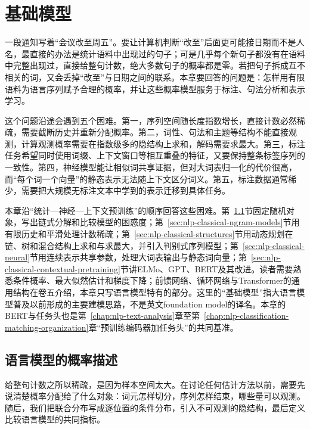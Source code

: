 \chapter{基础模型}
\label{chap:nlp-classical-models}

一段通知写着“会议改至周五”。要让计算机判断“改至”后面更可能接日期而不是人名，最直接的办法是统计语料中出现过的句子；可是几乎每个新句子都没有在语料中完整出现过，直接给整句计数，绝大多数句子的概率都是零。若把句子拆成互不相关的词，又会丢掉“改至”与日期之间的联系。本章要回答的问题是：怎样用有限语料为语言序列赋予合理的概率，并让这些概率模型服务于标注、句法分析和表示学习。

这个问题沿途会遇到五个困难。第一，序列空间随长度指数增长，直接计数必然稀疏，需要截断历史并重新分配概率。第二，词性、句法和主题等结构不能直接观测，计算观测概率需要在指数级多的隐结构上求和，解码需要求最大。第三，标注任务希望同时使用词缀、上下文窗口等相互重叠的特征，又要保持整条标签序列的一致性。第四，神经模型能让相似词共享证据，但对大词表归一化的代价很高，而“每个词一个向量”的静态表示无法随上下文区分词义。第五，标注数据通常稀少，需要把大规模无标注文本中学到的表示迁移到具体任务。

本章沿“统计—神经—上下文预训练”的顺序回答这些困难。第~\ref{sec:nlp-classical-probability}节固定随机对象，写出链式分解和比较模型的困惑度；第~\ref{sec:nlp-classical-ngram-models}节用有限历史和平滑处理计数稀疏；第~\ref{sec:nlp-classical-structures}节用动态规划在链、树和混合结构上求和与求最大，并引入判别式序列模型；第~\ref{sec:nlp-classical-neural}节用连续表示共享参数，处理大词表输出与静态词向量；第~\ref{sec:nlp-classical-contextual-pretraining}节讲ELMo、GPT、BERT及其改进。读者需要熟悉条件概率、最大似然估计和梯度下降；前馈网络、循环网络与Transformer的通用结构在卷五介绍，本章只写语言模型特有的部分。这里的“基础模型”指大语言模型普及以前形成的主要建模思路，不是英文foundation model的译名。本章的BERT与任务头也是第~\ref{chap:nlp-text-analysis}章至第~\ref{chap:nlp-classification-matching-organization}章“预训练编码器加任务头”的共同基准。

\section{语言模型的概率描述}
\label{sec:nlp-classical-probability}

给整句计数之所以稀疏，是因为样本空间太大。在讨论任何估计方法以前，需要先说清楚概率分配给了什么对象：词元怎样切分，序列怎样结束，哪些量可以观测。随后，我们把联合分布写成逐位置的条件分布，引入不可观测的隐结构，最后定义比较语言模型的共同指标。

